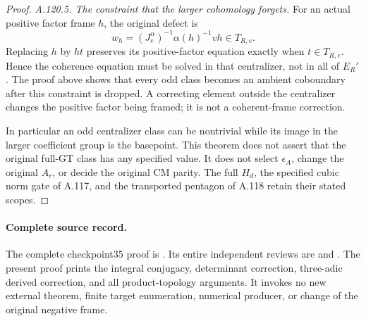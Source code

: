 \begin{proof}
\emph{A.120.5. The constraint that the larger cohomology forgets.}
For an actual positive factor frame \(h\), the original defect is
\[
          w_h=(J_e^\alpha)^{-1}\alpha(h)^{-1}vh
                        \in T_{R,e}.
 \tag{A.120.13}
\]
Replacing \(h\) by \(ht\) preserves its positive-factor equation
exactly when \(t\in T_{R,e}\). Hence the coherence equation
must be solved in that centralizer, not in all of \(E_R'\).
The proof above shows that every odd class becomes an ambient
coboundary after this constraint is dropped. A correcting element
outside the centralizer changes the positive factor being framed;
it is not a coherent-frame correction.

In particular an odd centralizer class can be nontrivial while its
image in the larger coefficient group is the basepoint.
This theorem does not assert that the original full-GT class has
any specified value. It does not select \(\epsilon_A\), change
the original \(A_r\), or decide the original CM parity.
The full \(H_d\), the specified cubic norm gate of A.117,
and the transported pentagon of A.118 retain their stated scopes.
\end{proof}

\paragraph{Complete source record.}
The complete checkpoint35 proof is
.
Its entire independent reviews are
and
.
The present proof prints the integral conjugacy, determinant correction,
three-adic derived correction, and all product-topology arguments.
It invokes no new external theorem, finite target enumeration,
numerical producer, or change of the original negative frame.
